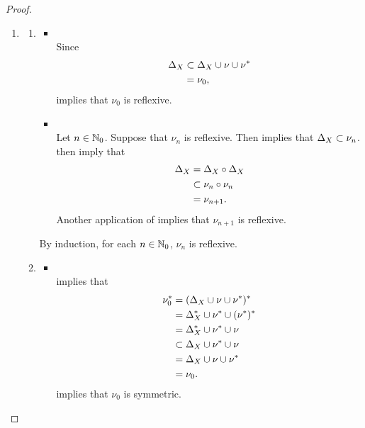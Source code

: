 \begin{proof}\
	\begin{enumerate}
		\item 
		\begin{enumerate}
			\item 
			\begin{itemize}
				\item {} \\
				Since
				\begin{align*}
					\Delta_X 
					& \subset \Delta_X \cup \nu \cup \nu^* \\
					& = \nu_0,
				\end{align*}
				 implies that $\nu_0$ is reflexive. 
				\item {} \\
				Let $n \in \mathbb{N}_0$. Suppose that $\nu_n$ is reflexive. Then   implies that $\Delta_X \subset \nu_n$.  then imply that
				\begin{align*}
					\Delta_X
					& = \Delta_X \circ \Delta_X \\
					& \subset \nu_n \circ  \nu_n \\
					& = \nu_{n+1}.
				\end{align*}
				Another application of  implies that $\nu_{n+1}$ is reflexive. 
			\end{itemize}
			By induction, for each $n \in \mathbb{N}_0$, $\nu_n$ is reflexive.
			\item 
			\begin{itemize}
				\item {} \\
				 implies that
				\begin{align*}
					\nu_0^*
					& = (\Delta_X \cup \nu \cup \nu^*)^* \\
					& = \Delta_X^* \cup \nu^* \cup (\nu^*)^* \\
					& = \Delta_X^* \cup \nu^* \cup \nu \\
					& \subset \Delta_X \cup \nu^* \cup \nu \\ 
					& = \Delta_X \cup \nu \cup \nu^* \\
					& = \nu_0. 
				\end{align*}
				 implies that $\nu_0$ is symmetric. 

\end{itemize}
\end{enumerate}
\end{enumerate}
\end{proof}
